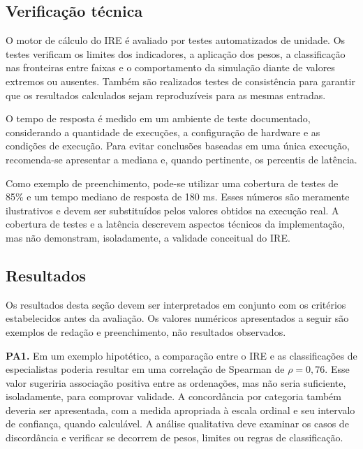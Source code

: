 \documentclass[portuguese]{sbc2025}%
\begin{document}
\subsection{Verificação técnica}
\label{sec:aval-tecnica}

O motor de cálculo do IRE é avaliado por testes automatizados de
unidade. Os testes verificam os limites dos indicadores, a aplicação
dos pesos, a classificação nas fronteiras entre faixas e o
comportamento da simulação diante de valores extremos ou ausentes.
Também são realizados testes de consistência para garantir que os
resultados calculados sejam reproduzíveis para as mesmas entradas.

O tempo de resposta é medido em um ambiente de teste documentado,
considerando a quantidade de execuções, a configuração de hardware
e as condições de execução. Para evitar conclusões baseadas em
uma única execução, recomenda-se apresentar a mediana e, quando
pertinente, os percentis de latência.

Como exemplo de preenchimento, pode-se utilizar uma cobertura de
testes de 85\% e um tempo mediano de resposta de 180 ms. Esses
números são meramente ilustrativos e devem ser substituídos pelos
valores obtidos na execução real. A cobertura de testes e a latência
descrevem aspectos técnicos da implementação, mas não demonstram,
isoladamente, a validade conceitual do IRE.

\subsection{Resultados}
\label{sec:aval-resultados}

Os resultados desta seção devem ser interpretados em conjunto com
os critérios estabelecidos antes da avaliação. Os valores numéricos
apresentados a seguir são exemplos de redação e preenchimento, não
resultados observados.

\textbf{PA1.}
Em um exemplo hipotético, a comparação entre o IRE e as classificações
de especialistas poderia resultar em uma correlação de Spearman de
$\rho = 0{,}76$. Esse valor sugeriria associação positiva entre as
ordenações, mas não seria suficiente, isoladamente, para comprovar
validade. A concordância por categoria também deveria ser apresentada,
com a medida apropriada à escala ordinal e seu intervalo de confiança,
quando calculável. A análise qualitativa deve examinar os casos de
discordância e verificar se decorrem de pesos, limites ou regras de
classificação.
\end{document}
